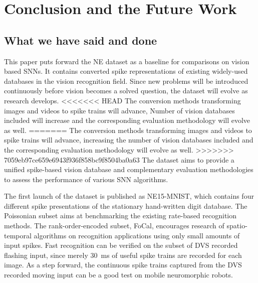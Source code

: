 \section{Conclusion and the Future Work}
\label{sec:summ}
\subsection{What we have said and done}
%
%

This paper puts forward the NE dataset as a baseline for comparisons on vision based SNNs.
It contains converted spike representations of existing widely-used databases in the vision recognition field.
Since new problems will be introduced continuously before vision becomes a solved question, the dataset will evolve as research develops. 
<<<<<<< HEAD
The conversion methods transforming images and videos to spike trains will advance, Number of vision databases included will increase and the corresponding evaluation methodology will evolve as well.
=======
The conversion methods transforming images and videos to spike trains will advance, increasing the number of vision databases included and the corresponding evaluation methodology will evolve as well.
>>>>>>> 7059eb97ce659e6943f936f858bc9f8504ba0a63
The dataset aims to provide a unified spike-based vision database and complementary evaluation methodologies to assess the performance of various SNN algorithms.

The first launch of the dataset is published as NE15-MNIST, which contains four different spike presentations of the stationary hand-written digit database.
The Poissonian subset aims at benchmarking the existing rate-based recognition methods.
The rank-order-encoded subset, FoCal, encourages research of spatio-temporal algorithms on recognition applications using only small amounts of input spikes.
Fast recognition can be verified on the subset of DVS recorded flashing input, since merely 30~ms of useful spike trains are recorded for each image.
As a step forward, the continuous spike trains captured from the DVS recorded moving input can be a good test on mobile neuromorphic robots.


